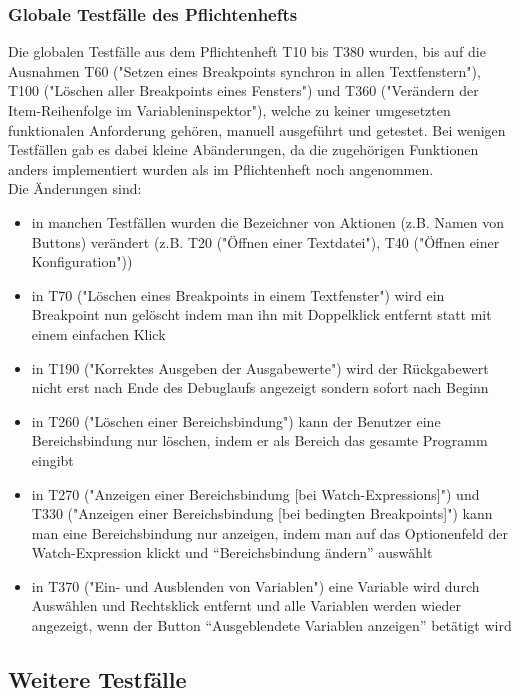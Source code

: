 \documentclass[parskip=full]{scrartcl}
\begin{document}
\subsubsection{Globale Testfälle des Pflichtenhefts} %
Die globalen Testfälle aus dem Pflichtenheft T10 bis T380 wurden, bis auf die Ausnahmen T60 ("Setzen eines Breakpoints synchron in allen Textfenstern"), T100 ("Löschen aller Breakpoints eines Fensters") und T360 ("Verändern der Item-Reihenfolge im Variableninspektor"), welche zu keiner umgesetzten funktionalen Anforderung gehören, manuell ausgeführt und getestet. Bei wenigen Testfällen gab es dabei kleine Abänderungen, da die zugehörigen Funktionen anders implementiert wurden als im Pflichtenheft noch angenommen. \\
Die Änderungen sind: \\
\begin{itemize}
	\item in manchen Testfällen wurden die Bezeichner von Aktionen (z.B. Namen von Buttons) verändert (z.B. T20 ("Öffnen einer Textdatei"), T40 ("Öffnen einer Konfiguration"))
	\item in T70 ("Löschen eines Breakpoints in einem Textfenster") wird ein Breakpoint nun gelöscht indem man ihn mit Doppelklick entfernt statt mit einem einfachen Klick
	\item  in T190 ("Korrektes Ausgeben der Ausgabewerte") wird der Rückgabewert nicht erst nach Ende des Debuglaufs angezeigt sondern sofort nach Beginn
	\item in T260 ("Löschen einer Bereichsbindung") kann der Benutzer eine Bereichsbindung nur löschen, indem er als Bereich das gesamte Programm eingibt
	\item in T270 ("Anzeigen einer Bereichsbindung [bei Watch-Expressions]") und T330 ("Anzeigen einer Bereichsbindung [bei bedingten Breakpoints]") kann man eine Bereichsbindung nur anzeigen, indem man auf das Optionenfeld der Watch-Expression klickt und \enquote{Bereichsbindung ändern} auswählt
	\item in T370 ("Ein- und Ausblenden von Variablen") eine Variable wird durch Auswählen und Rechtsklick entfernt und alle Variablen werden wieder angezeigt, wenn der Button \enquote{Ausgeblendete Variablen anzeigen} betätigt wird
\end{itemize}

\subsection{Weitere Testfälle}
\end{document}
